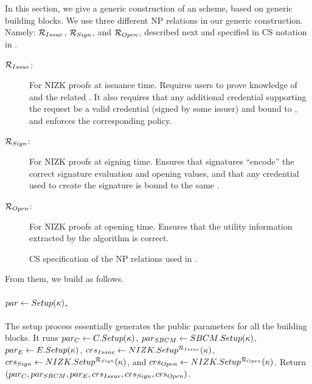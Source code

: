 In this section, we give a generic construction of an \UAS scheme, based on
generic building blocks. We use three different NP relations in our generic
construction. Namely: $\mathcal{R}_{Issue}$, $\mathcal{R}_{Sign}$, and
$\mathcal{R}_{Open}$, described next and specified in CS notation \cite{cs97}
in .

\begin{description}
\item[$\mathcal{R}_{Issue}$:] For NIZK proofs at issuance time. Requires users to
  prove knowledge of \usk and the related \upk. It also requires that any
  additional credential supporting the request be a valid credential (signed by
  some issuer) and bound to \upk, and enforces the corresponding \fissue policy.
\item[$\mathcal{R}_{Sign}$:] For NIZK proofs at signing time. Ensures that
  signatures ``encode'' the correct signature evaluation and opening values, and
  that any credential used to create the signature is bound to the same \upk.
\item[$\mathcal{R}_{Open}$:] For NIZK proofs at opening time. Ensures that the
  utility information extracted by the \Open algorithm is correct.
\end{description}

\begin{figure}[ht!]
  \centering
  \scalebox{0.9}{
    
  }
  \caption{CS specification of the NP relations used in \CUASGen.}
  \label{fig:nizkrels}
\end{figure}

From them, we build \CUASGen as follows.

\paragraph{$par \gets Setup(\kappa)$.} %
The setup process essentially generates the public parameters for all the
building blocks. It runs $par_C \gets C.Setup(\kappa)$, $par_{SBCM} \gets
SBCM.Setup(\kappa)$, $par_{E} \gets E.Setup(\kappa)$, $crs_{Issue} \gets
NIZK.Setup^{\mathcal{R}_{Issue}}(\kappa)$, $crs_{Sign} \gets
NIZK.Setup^{\mathcal{R}_{Sign}}(\kappa)$, and $crs_{Open} \gets
NIZK.Setup^{\mathcal{R}_{Open}}(\kappa)$. Return $(par_C,par_{SBCM},par_{E},
crs_{Issue},crs_{Sign},crs_{Open})$.



